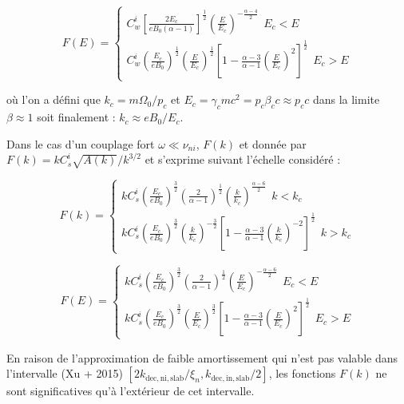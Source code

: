 \documentclass[10pt,a4paper]{article}
\begin{document}
\begin{equation}
F(E)  =  \left\{
\begin{array}{rl}
  C^i_{w} \left[\frac{2E_c}{eB_0(\alpha - 1)} \right]^{\frac{1}{2}} \left( \frac{E}{E_c} \right)^{-\frac{\alpha - 4}{2}} ~~ E_c < E \\
  C^i_{w} \left( \frac{E_c}{eB_0} \right)^\frac{1}{2} \left( \frac{E}{E_c} \right)^{\frac{1}{2}} \left [ 1 - \frac{\alpha - 3}{\alpha - 1} \left( \frac{E}{E_c} \right)^{2} \right]^{\frac{1}{2}} ~~ E_c > E 
\end{array}
\right.
\end{equation}

où l'on a défini que $k_c = m\Omega_0 / p_c$ et $E_c = \gamma_c m c^2 = p_c \beta_c c \approx p_c c$ dans la limite $\beta \approx 1$ soit finalement : $k_c \approx eB_0 / E_c$.  

Dans le cas d'un couplage fort $\omega \ll \nu_{ni}$, $F(k)$ et donnée par $F(k) = kC^i_{s}\sqrt{A(k)}/k^{3/2}$ et s'exprime suivant l'échelle considéré : 

\begin{equation}
F(k) = \left\{
\begin{array}{rl}
  kC^i_{s} \left( \frac{E_c}{eB_0} \right)^{\frac{3}{2}} \left( \frac{2}{\alpha - 1} \right)^{\frac{1}{2}} \left( \frac{k}{k_c} \right)^{\frac{\alpha - 6}{2}}   ~~ k < k_c \\
  kC^i_s \left( \frac{E_c}{eB_0} \right)^{\frac{3}{2}} \left( \frac{k}{k_c} \right)^{-\frac{3}{2}} \left [ 1 - \frac{\alpha - 3}{\alpha - 1} \left( \frac{k}{k_c} \right)^{-2} \right]^{\frac{1}{2}}~~ k > k_c 
\end{array}
\right.
\end{equation}


\begin{equation}
F(E) = \left\{
\begin{array}{rl}
  kC^i_{s} \left( \frac{E_c}{eB_0} \right)^{\frac{3}{2}} \left( \frac{2}{\alpha - 1} \right)^{\frac{1}{2}} \left( \frac{E}{E_c} \right)^{-\frac{\alpha - 6}{2}}   ~~ E_c < E \\
  kC^i_{s} \left( \frac{E_c}{eB_0} \right)^{\frac{3}{2}} \left( \frac{E}{E_c} \right)^{\frac{3}{2}} \left [ 1 - \frac{\alpha - 3}{\alpha - 1} \left( \frac{E}{E_c} \right)^{2} \right]^{\frac{1}{2}}~~ E_c > E 
\end{array}
\right.
\end{equation}

En raison de l'approximation de faible amortissement qui n'est pas valable dans l'intervalle (Xu + 2015) $\left[ 2 k_\mathrm{dec,ni,slab} / \xi_n, k_\mathrm{dec,in,slab}/2 \right]$, les fonctions $F(k)$ ne sont significatives qu'à l'extérieur de cet intervalle. \\ 
\end{document}
